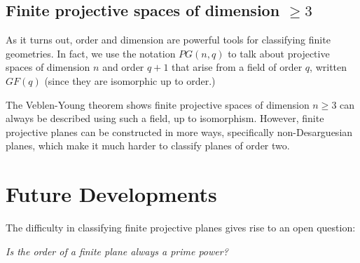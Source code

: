 \documentclass[12pt]{article}
\begin{document}
    \subsection{Finite projective spaces of dimension $\geq 3$ }

    As it turns out, order and dimension are powerful tools for classifying finite geometries.
    In fact, we use the notation $PG(n, q)$ to talk about projective spaces of dimension $n$ and order $q+1$
    that arise from a field of order $q$, written $GF(q)$ (since they are isomorphic up to order.)

    The Veblen-Young theorem shows finite projective spaces of dimension $n \geq 3$ can always be described using such a field, up to isomorphism.
    However, finite projective planes can be constructed in more ways, specifically non-Desarguesian planes, which make
    it much harder to classify planes of order two.

    \section{Future Developments}

    The difficulty in classifying finite projective planes gives rise to an open question:

    \textit{Is the order of a finite plane always a prime power?}


    
    
\end{document}
